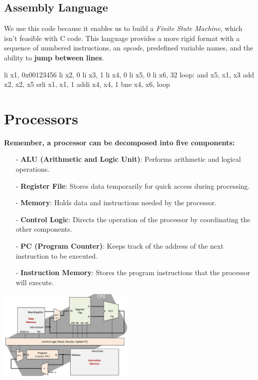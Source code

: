 \subsection{Assembly Language}
We use this code because it enables us to build a \textit{Finite State Machine}, which isn't feasible with C code. This language provides a more rigid format with a sequence of numbered instructions, an \textit{opcode}, predefined variable names, and the ability to \textbf{jump between lines}.
\newpage
\begin{center}
    \begin{assembly}
    li x1, 0x00123456
    li x2, 0
    li x3, 1
    li x4, 0
    li x5, 0
    li x6, 32
loop: and x5, x1, x3
    add x2, x2, x5
    srli x1, x1, 1
    addi x4, x4, 1
    bne x4, x6, loop
    \end{assembly}
\end{center}

\section{Processors}
\textbf{Remember, a processor can be decomposed into five components:} \newline
\begin{itemize}[noitemsep]
    \item[-] \textbf{ALU (Arithmetic and Logic Unit)}: Performs arithmetic and logical operations.
    \item[-] \textbf{Register File}: Stores data temporarily for quick access during processing.
    \item[-] \textbf{Memory}: Holds data and instructions needed by the processor.
    \item[-] \textbf{Control Logic}: Directs the operation of the processor by coordinating the other components.
    \item[-] \textbf{PC (Program Counter)}: Keeps track of the address of the next instruction to be executed.
    \item[-] \textbf{Instruction Memory}: Stores the program instructions that the processor will execute.
\end{itemize}
\begin{center}
    \includegraphics[width=0.5\textwidth]{chapters/chapter1/images/processor.png}
\end{center}

